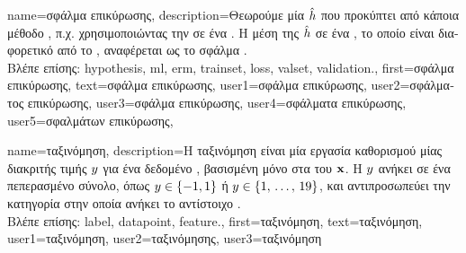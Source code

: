 {name={\foreignlanguage{greek}{σφάλμα επικύρωσης}},
	description={\foreignlanguage{greek}{Θεωρούμε μία}  $\hat{h}$ 
		\foreignlanguage{greek}{που προκύπτει από κάποια μέθοδο} , \foreignlanguage{greek}{π.χ. χρησιμοποιώντας την}  
		\foreignlanguage{greek}{σε ένα} . \foreignlanguage{greek}{Η μέση}  \foreignlanguage{greek}{της}
 		$\hat{h}$ \foreignlanguage{greek}{σε ένα} , \foreignlanguage{greek}{το οποίο είναι διαφορετικό από το} , 
		\foreignlanguage{greek}{αναφέρεται ως το σφάλμα} .\\
		\foreignlanguage{greek}{Βλέπε επίσης:} \gls{hypothesis}, \gls{ml}, \gls{erm}, \gls{trainset}, \gls{loss}, \gls{valset}, \gls{validation}.},
	first={\foreignlanguage{greek}{σφάλμα επικύρωσης}},
	text={\foreignlanguage{greek}{σφάλμα επικύρωσης}},
	user1={\foreignlanguage{greek}{σφάλμα επικύρωσης}}, %
	user2={\foreignlanguage{greek}{σφάλματος επικύρωσης}}, %
	user3={\foreignlanguage{greek}{σφάλμα επικύρωσης}}, %
	user4={\foreignlanguage{greek}{σφάλματα επικύρωσης}}, %
	user5={\foreignlanguage{greek}{σφαλμάτων επικύρωσης}}, %
}

{name={\foreignlanguage{greek}{ταξινόμηση}},
	description={\foreignlanguage{greek}{Η ταξινόμηση είναι μία εργασία καθορισμού} 
 		\foreignlanguage{greek}{μίας}  \foreignlanguage{greek}{διακριτής τιμής} $y$ 
		\foreignlanguage{greek}{για ένα δεδομένο} , \foreignlanguage{greek}{βασισμένη μόνο στα}  
 		 \foreignlanguage{greek}{του} ${\bf x}$. \foreignlanguage{greek}{Η}  $y$ 
		\foreignlanguage{greek}{ανήκει σε ένα πεπερασμένο σύνολο, όπως  
 		$y \in \{-1,1\}$ ή $y \in \{1, \,\ldots, \,19\}$, και αντιπροσωπεύει την κατηγορία στην οποία ανήκει το  
 		αντίστοιχο} .\\
		\foreignlanguage{greek}{Βλέπε επίσης:} \gls{label}, \gls{datapoint}, \gls{feature}.},
	first={\foreignlanguage{greek}{ταξινόμηση}},
	text={\foreignlanguage{greek}{ταξινόμηση}},
	user1={\foreignlanguage{greek}{ταξινόμηση}}, %
	user2={\foreignlanguage{greek}{ταξινόμησης}}, %
	user3={\foreignlanguage{greek}{ταξινόμηση}} %
}

